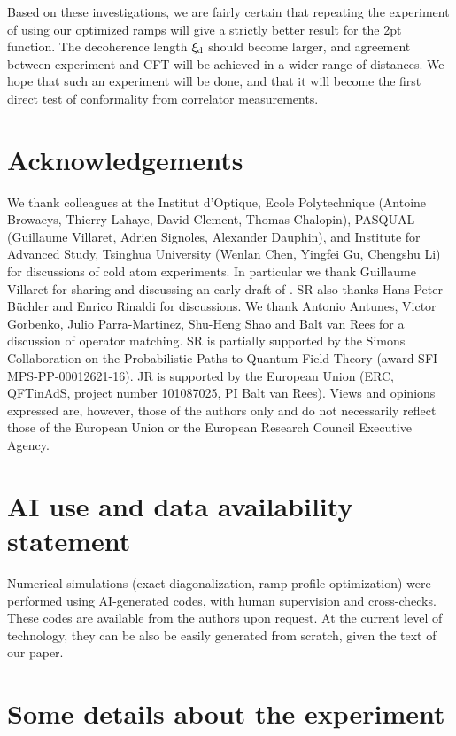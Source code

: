 \documentclass[a4paper,11pt]{article}
\theoremstyle{remark}
\theoremstyle{theorem}
\begin{document}
Based on these investigations, we are fairly certain that repeating the experiment of \cite{Fang:2024uyf} using our optimized ramps will give a strictly better result for the 2pt function. The decoherence length $\xi_{\rm d}$ should become larger, and agreement between experiment and CFT will be achieved in a wider range of distances. We hope that such an experiment will be done, and that it will become the first direct test of conformality from correlator measurements.

\section*{Acknowledgements}

We thank colleagues at the Institut d'Optique, Ecole Polytechnique (Antoine
Browaeys, Thierry Lahaye, David Clement, Thomas Chalopin), PASQUAL (Guillaume
Villaret, Adrien Signoles, Alexander Dauphin), and Institute for Advanced
Study, Tsinghua University (Wenlan Chen, Yingfei Gu, Chengshu Li) for
discussions of cold atom experiments. In particular we thank Guillaume Villaret for sharing and discussing an early draft of \cite{Dalyac:2026jpu}. SR also thanks Hans Peter B{\"u}chler
and Enrico Rinaldi for discussions. We thank Antonio Antunes, Victor Gorbenko, Julio Parra-Martinez, Shu-Heng Shao and Balt van Rees for a discussion of operator matching. SR is partially supported by the Simons
Collaboration on the Probabilistic Paths to Quantum Field Theory (award
SFI-MPS-PP-00012621-16).
JR is supported by the European Union (ERC, QFTinAdS, project number 101087025, PI Balt van Rees). Views and opinions expressed are, however, those of the authors only and do not necessarily reflect those of the European Union or the European Research Council Executive Agency.

\section*{AI use and data availability statement}

Numerical simulations (exact diagonalization, ramp profile optimization) were performed using AI-generated codes, with human supervision and cross-checks. These codes are available from the authors upon request. At the current level of technology, they can be also be easily generated from scratch, given the text of our paper.

\appendix

\section{Some details about the experiment \cite{Fang:2024uyf}}
\label{sec:Yao-details}
\end{document}
